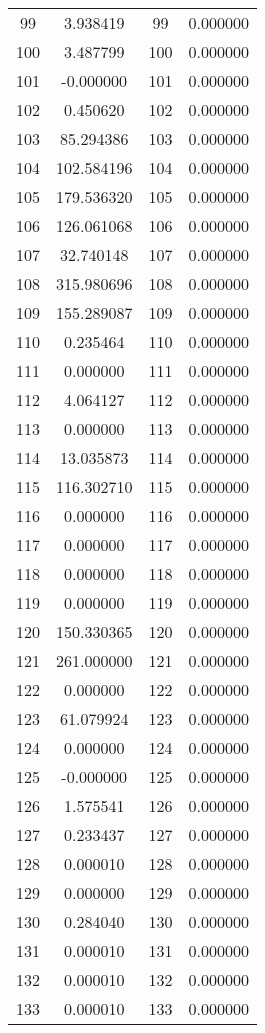 \documentclass[12pt]{article}
\begin{document}
\begin{longtable}{@{}cccc@{}}
99 & 3.938419 & 99 & 0.000000 \\
100 & 3.487799 & 100 & 0.000000 \\
101 & -0.000000 & 101 & 0.000000 \\
102 & 0.450620 & 102 & 0.000000 \\
103 & 85.294386 & 103 & 0.000000 \\
104 & 102.584196 & 104 & 0.000000 \\
105 & 179.536320 & 105 & 0.000000 \\
106 & 126.061068 & 106 & 0.000000 \\
107 & 32.740148 & 107 & 0.000000 \\
108 & 315.980696 & 108 & 0.000000 \\
109 & 155.289087 & 109 & 0.000000 \\
110 & 0.235464 & 110 & 0.000000 \\
111 & 0.000000 & 111 & 0.000000 \\
112 & 4.064127 & 112 & 0.000000 \\
113 & 0.000000 & 113 & 0.000000 \\
114 & 13.035873 & 114 & 0.000000 \\
115 & 116.302710 & 115 & 0.000000 \\
116 & 0.000000 & 116 & 0.000000 \\
117 & 0.000000 & 117 & 0.000000 \\
118 & 0.000000 & 118 & 0.000000 \\
119 & 0.000000 & 119 & 0.000000 \\
120 & 150.330365 & 120 & 0.000000 \\
121 & 261.000000 & 121 & 0.000000 \\
122 & 0.000000 & 122 & 0.000000 \\
123 & 61.079924 & 123 & 0.000000 \\
124 & 0.000000 & 124 & 0.000000 \\
125 & -0.000000 & 125 & 0.000000 \\
126 & 1.575541 & 126 & 0.000000 \\
127 & 0.233437 & 127 & 0.000000 \\
128 & 0.000010 & 128 & 0.000000 \\
129 & 0.000000 & 129 & 0.000000 \\
130 & 0.284040 & 130 & 0.000000 \\
131 & 0.000010 & 131 & 0.000000 \\
132 & 0.000010 & 132 & 0.000000 \\
133 & 0.000010 & 133 & 0.000000 \\

\end{longtable}
\end{document}
